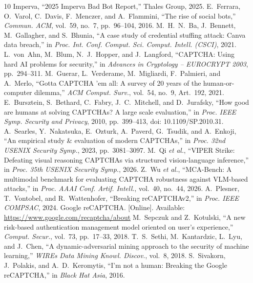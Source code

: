 \documentclass{ieeetj}
\begin{document}
\begin{thebibliography}{10}
 Imperva, ``2025 Imperva Bad Bot Report,'' Thales Group, 2025.
 E.~Ferrara, O.~Varol, C.~Davis, F.~Menczer, and A.~Flammini, ``The rise of social bots,'' \emph{Commun. ACM}, vol.~59, no.~7, pp.~96--104, 2016.
 M.~H.~N.~Ba, J.~Bennett, M.~Gallagher, and S.~Bhunia, ``A case study of credential stuffing attack: Canva data breach,'' in \emph{Proc. Int. Conf. Comput. Sci. Comput. Intell. (CSCI)}, 2021.
 L.~von~Ahn, M.~Blum, N.~J.~Hopper, and J.~Langford, ``CAPTCHA: Using hard AI problems for security,'' in \emph{Advances in Cryptology -- EUROCRYPT 2003}, pp.~294--311.
 M.~Guerar, L.~Verderame, M.~Migliardi, F.~Palmieri, and A.~Merlo, ``Gotta CAPTCHA 'em all: A survey of 20 years of the human-or-computer dilemma,'' \emph{ACM Comput. Surv.}, vol.~54, no.~9, Art.~192, 2021.
 E.~Bursztein, S.~Bethard, C.~Fabry, J.~C.~Mitchell, and D.~Jurafsky, ``How good are humans at solving CAPTCHAs? A large scale evaluation,'' in \emph{Proc. IEEE Symp. Security and Privacy}, 2010, pp.~399--413, doi: 10.1109/SP.2010.31.
 A.~Searles, Y.~Nakatsuka, E.~Ozturk, A.~Paverd, G.~Tsudik, and A.~Enkoji, ``An empirical study \& evaluation of modern CAPTCHAs,'' in \emph{Proc. 32nd USENIX Security Symp.}, 2023, pp.~3081--3097.
 M.~Qi \emph{et al.}, ``VIPER Strike: Defeating visual reasoning CAPTCHAs via structured vision-language inference,'' in \emph{Proc. 35th USENIX Security Symp.}, 2026.
 Z.~Wu \emph{et al.}, ``MCA-Bench: A multimodal benchmark for evaluating CAPTCHA robustness against VLM-based attacks,'' in \emph{Proc. AAAI Conf. Artif. Intell.}, vol.~40, no.~44, 2026.
 A.~Plesner, T.~Vontobel, and R.~Wattenhofer, ``Breaking reCAPTCHAv2,'' in \emph{Proc. IEEE COMPSAC}, 2024.
 Google reCAPTCHA. [Online]. Available: \url{https://www.google.com/recaptcha/about}
 M.~Sepczuk and Z.~Kotulski, ``A new risk-based authentication management model oriented on user's experience,'' \emph{Comput. Secur.}, vol.~73, pp.~17--33, 2018.
 T.~S.~Sethi, M.~Kantardzic, L.~Lyu, and J.~Chen, ``A dynamic-adversarial mining approach to the security of machine learning,'' \emph{WIREs Data Mining Knowl. Discov.}, vol.~8, 2018.
 S.~Sivakorn, J.~Polakis, and A.~D.~Keromytis, ``I'm not a human: Breaking the Google reCAPTCHA,'' in \emph{Black Hat Asia}, 2016.

\end{thebibliography}
\end{document}

